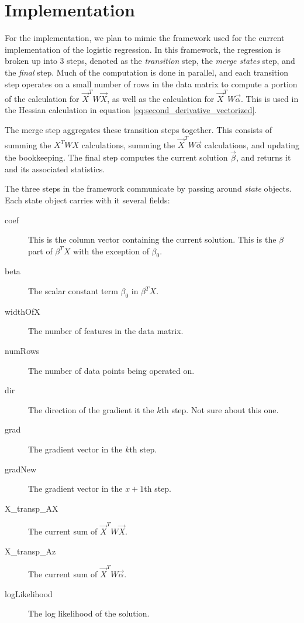 \section{Implementation}\label{sec:implem}

For the implementation, we plan to mimic the framework used for the current implementation of the logistic regression.  In this framework, the regression is broken up into 3 steps, denoted as the  \textit{transition} step, the \textit{merge states} step, and the \textit{final} step.  Much of the computation is done in parallel, and each transition step operates on a small number of rows in the data matrix to compute a portion of the calculation for $\vec{X}^T W\vec{X}$, as well as the calculation for $\vec{X}^TW\vec{\alpha}$. This is used in the Hessian calculation in equation \ref{eq:second_derivative_vectorized}.  

The merge step aggregates these transition steps together.  This consists of summing the $X^T WX$ calculations, summing the $\vec{X}^TW\vec{\alpha}$ calculations, and updating the bookkeeping.   The final step computes the current solution $\vec{\beta}$, and returns it and its associated statistics.  

The three steps in the framework communicate by passing around \textit{state} objects.  Each state object carries with it several fields:  
\begin{description}
\item [coef] This is the column vector containing the current solution.  This is the $\beta$ part of $\beta^TX$ with the exception of $\beta_0$.
\item [beta] The scalar constant term $\beta_0$ in $\beta^TX$.
\item [widthOfX] The number of features in the data matrix.  
\item [numRows] The number of data points being operated on.  
\item [dir] The direction of the gradient it the $k$th step.  Not sure about this one.  
\item [grad] The gradient vector in the $k$th step.
\item [gradNew] The gradient vector in the $x+1$th step.  
\item [X\_transp\_AX] The current sum of $\vec{X}^T W\vec{X}$.   
\item [X\_transp\_Az] The current sum of $\vec{X}^TW\vec{\alpha}$.
\item [logLikelihood] The log likelihood  of the solution.  
\end{description}

